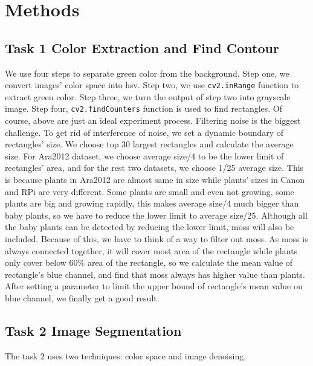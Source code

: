 \documentclass[conference]{IEEEtran}
\begin{document}
\section{Methods}

\subsection{Task 1 Color Extraction and Find Contour}

We use four steps to separate green color from the background.
Step one, we convert images’ color space into hsv. Step two, we use \verb|cv2.inRange| function to extract green color. Step three, we turn the output of step two into grayscale image. Step four, \verb|cv2.findCounters| function is used to find rectangles.
Of course, above are just an ideal experiment process. Filtering noise is the biggest challenge. To get rid of interference of noise, we set a dynamic boundary of rectangles' size. We choose top 30 largest rectangles and calculate the average size. For Ara2012 dataset, we choose average size/4 to be the lower limit of rectangles' area, and for the rest two datasets, we choose 1/25 average size. This is because plants in Ara2012 are almost same in size while plants’ sizes in Canon and RPi are very different. Some plants are small and even not growing, some plants are big and growing rapidly, this makes average size/4 much bigger than baby plants, so we have to reduce the lower limit to average size/25.
Although all the baby plants can be detected by reducing the lower limit, moss will also be included. Because of this, we have to think of a way to filter out moss. As moss is always connected together, it will cover most area of the rectangle while plants only cover below 60\% area of the rectangle, so we calculate the mean value of rectangle’s blue channel, and find that moss always has higher value than plants. After setting a parameter to limit the upper bound of rectangle’s mean value on blue channel, we finally get a good result.

\subsection{Task 2 Image Segmentation}
The task 2 uses two techniques: color space and image denoising.
\end{document}

